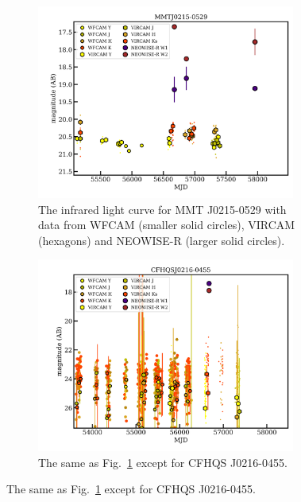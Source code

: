 \documentclass[usenatbib]{mnras}
\begin{document}
\begin{figure}
  \begin{subfigure}{}
    \centering
    \includegraphics[width=8.5cm]{../light_curves/MMTJ0215-0529LC_20190214.png}
    \caption{The infrared light curve for MMT J0215-0529 with data from 
      WFCAM (smaller solid circles), VIRCAM (hexagons) and NEOWISE-R (larger solid circles).}
    \label{fig:MMTJ0215-0529}
  \end{subfigure} 
  \begin{subfigure}{}
    \centering
    \includegraphics[width=8.5cm]{../light_curves/CFHQSJ0216-0455LC_20190214.png}
    \caption{The same as Fig.~\ref{fig:MMTJ0215-0529} except for CFHQS J0216-0455.}
    \label{fig:CFHQSJ0216-0455}
  \end{subfigure}
\end{figure}
\end{document}
